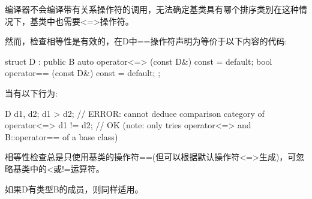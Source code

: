 编译器不会编译带有关系操作符的调用，无法确定基类具有哪个排序类别在这种情况下，基类中也需要<=>操作符。

然而，检查相等性是有效的，在D中==操作符声明为等价于以下内容的代码:

\begin{cpp}
struct D : public B {
	auto operator<=> (const D&) const = default;
	bool operator== (const D&) const = default;
};
\end{cpp}

当有以下行为:

\begin{cpp}
D d1, d2;
d1 > d2; // ERROR: cannot deduce comparison category of operator<=>
d1 != d2; // OK (note: only tries operator<=> and B::operator== of a base class)
\end{cpp}

相等性检查总是只使用基类的操作符==(但可以根据默认操作符<=>生成)，可忽略基类中的<或!=运算符。

如果D有类型B的成员，则同样适用。
